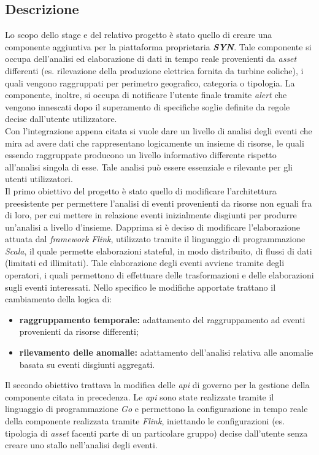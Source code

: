 \subsection{Descrizione}

Lo scopo dello stage e del relativo progetto è stato quello di creare una componente aggiuntiva per la piattaforma proprietaria \textbf{\textit{SYN}}. Tale componente si occupa dell'analisi ed elaborazione di dati in tempo reale provenienti da \textit{asset} differenti (es. rilevazione della produzione elettrica fornita da turbine eoliche), i quali vengono raggruppati per perimetro geografico, categoria o tipologia. La componente, inoltre,
si occupa di notificare l'utente finale tramite \textit{alert} che vengono innescati dopo il superamento di specifiche soglie definite da regole decise dall'utente utilizzatore.\\
Con l'integrazione appena citata si vuole dare un livello di analisi degli eventi che mira ad avere dati che rappresentano logicamente un insieme di risorse, le quali essendo raggruppate producono un livello informativo differente rispetto all'analisi singola di esse. Tale analisi può essere essenziale e rilevante per gli utenti utilizzatori.\\
Il primo obiettivo del progetto è stato quello di modificare l'architettura preesistente per permettere l'analisi di eventi provenienti da risorse non eguali fra di loro, per cui mettere in relazione eventi inizialmente disgiunti per produrre un'analisi a livello d'insieme. Dapprima si è deciso di modificare l'elaborazione attuata dal \textit{\gls{framework}} \textit{Flink}, utilizzato tramite il linguaggio di programmazione \textit{Scala}, il quale permette elaborazioni \gls{stateful}, in modo distribuito, di flussi di dati (limitati ed illimitati). Tale elaborazione degli eventi avviene tramite degli operatori, i quali permettono di effettuare delle trasformazioni e delle elaborazioni sugli eventi interessati. Nello specifico le modifiche apportate trattano il cambiamento della logica di:
\begin{itemize}
	\item{\textbf{raggruppamento temporale:} adattamento del raggruppamento ad eventi provenienti da risorse differenti;}
	\item{\textbf{rilevamento delle anomalie:} adattamento dell'analisi relativa alle anomalie basata su eventi disgiunti aggregati.}
\end{itemize}
Il secondo obiettivo trattava la modifica delle \textit{\gls{api}} di governo per la gestione della componente citata in precedenza. Le \textit{\gls{api}} sono state realizzate tramite il linguaggio di programmazione \textit{Go} e permettono la configurazione in tempo reale della componente realizzata tramite \textit{Flink}, iniettando le configurazioni (es. tipologia di \textit{asset} facenti parte di un particolare gruppo) decise dall'utente senza creare uno stallo nell'analisi degli eventi.

